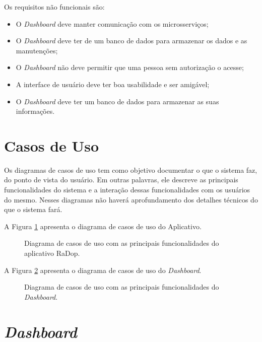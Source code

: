 Os requisitos não funcionais são:

\begin{itemize}
    \item O \textit{Dashboard} deve manter comunicação com os microsserviços;
    \item O \textit{Dashboard} deve ter de um banco de dados para armazenar os dados e as manutenções;
    \item O \textit{Dashboard} não deve permitir que uma pessoa sem autorização o acesse;
    \item A interface de usuário deve ter boa usabilidade e ser amigável;
    \item O \textit{Dashboard} deve ter um banco de dados para armazenar as suas informações.
\end{itemize}

\section{Casos de Uso}

Os diagramas de casos de uso tem como objetivo documentar o que o sistema faz, do ponto de vista do usuário. Em outras palavras, ele descreve as principais funcionalidades do sistema e a interação dessas funcionalidades com os usuários do mesmo. Nesses diagramas não haverá aprofundamento dos detalhes técnicos do que o sistema fará.

A Figura \ref{fig:casos_de_uso} apresenta o diagrama de casos de uso do Aplicativo.

\begin{figure}[H]
	\caption{\label{fig:casos_de_uso} Diagrama de casos de uso com as principais funcionalidades do aplicativo RaDop.}
\end{figure}

A Figura \ref{fig:diagrama-comm-soft} apresenta o diagrama de casos de uso do \textit{Dashboard}.

\begin{figure}[H]
	\caption{\label{fig:diagrama-comm-soft} Diagrama de casos de uso com as principais funcionalidades do \textit{Dashboard}.}
\end{figure}

\section{\textit{Dashboard}}

